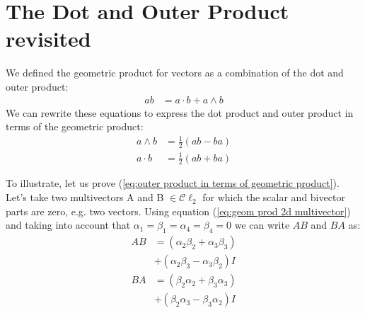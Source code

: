 \documentclass[10pt]{report}
\begin{document}
\section{The Dot and Outer Product revisited}

We defined the geometric product for vectors as a combination of
the dot and outer product:
\begin{align*}
    ab &= a\cdot b + a\wedge b
\end{align*}
We can rewrite these equations to express the dot product and
outer product in terms of the geometric product:
\begin{align}
    \label{eq:outer product in terms of geometric product}
    a\wedge b &= \frac{1}{2}(ab - ba)\\
    \label{eq:inner product in terms of geometric product}
    a\cdot  b &= \frac{1}{2}(ab + ba)
\end{align}

To illustrate, let us prove (\ref{eq:outer product in terms of
geometric product}). Let's take two multivectors A and B $\in
\mathcal{C}\ell_2$ for which the scalar and bivector parts are
zero, e.g. two vectors. Using equation (\ref{eq:geom prod 2d
multivector}) and taking into account that
$\alpha_1=\beta_1=\alpha_4=\beta_4=0$ we can write $AB$ and $BA$
as:
\begin{align}
    \label{eq:AB for vectors}
    AB &= (\alpha_2 \beta_2 + \alpha_3 \beta_3)   \\
       &+ (\alpha_2 \beta_3 - \alpha_3 \beta_2) I \nonumber
\end{align}
\begin{align}
    \label{eq:BA for vectors}
    BA &= (\beta_2 \alpha_2 + \beta_3 \alpha_3)   \\
       &+ (\beta_2 \alpha_3 - \beta_3 \alpha_2) I \nonumber
\end{align}
\end{document}
